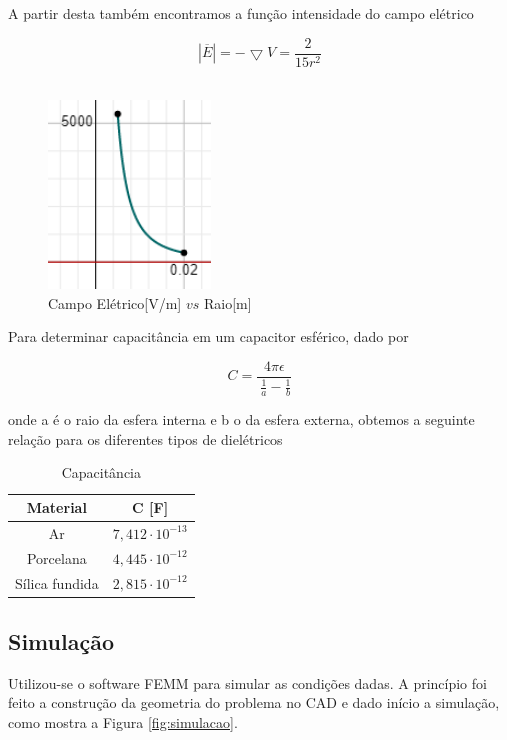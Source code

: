 \documentclass[a4paper]{article}
\begin{document}
\begin{multicols}{2}
	A partir desta também encontramos a função intensidade do campo elétrico

	\begin{equation} \label{eq:campo}
		\boxed{|\overline{E}|=-\bigtriangledown V=\frac{2}{15r^2}}
	\end{equation}
\\
\begin{figure} [H]
	\centering
	\caption{Campo Elétrico[V/m] $vs$ Raio[m]\label{fig:campo}}
	\includegraphics[height=5cm,fbox]{latex/campo.png}
\end{figure}
	
	Para determinar capacitância em um capacitor esférico, dado por
	
	\begin{equation} \label{eq:capacitancia}
		\boxed{C=\frac{4\pi \epsilon }{\:\frac{1}{a}-\frac{1}{b}}}
	\end{equation}
	
	\noindent onde a é o raio da esfera interna e b o da esfera externa, obtemos a seguinte relação para os diferentes tipos de dielétricos
	
	\begin{table} [H]
		\centering
	    \caption{Capacitância\label{tab:capacitancia}}
		\begin{tabular}{|c|c|}
		\hline
		Material & C [F] \\
		\hline
		Ar & $7,412\cdot10^{-13}$ \\
		\hline
		Porcelana & $4,445\cdot10^{-12}$ \\
		\hline
		Sílica fundida & $2,815\cdot10^{-12}$ \\
		\hline
	\end{tabular}
	\end{table}
	
	\subsection{Simulação}
	Utilizou-se o software FEMM para simular as condições dadas. A princípio foi feito a construção da geometria do problema no CAD e dado início a simulação, como mostra a Figura \ref{fig:simulacao}.


\end{multicols}
\end{document}
